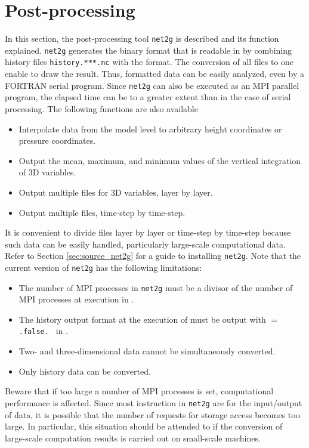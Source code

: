\section{Post-processing} \label{sec:net2g}

In this section, the post-processing tool \verb|net2g| is described and its function explained. \verb|net2g| generates the binary format that is readable in \grads by combining history files \verb|history.***.nc| with the \netcdf format.
The conversion of all files to one enable \grads to draw the result.
Thus, formatted data can be easily analyzed, even by a FORTRAN serial program.
Since \verb|net2g| can also be executed as an MPI parallel program,
the elapsed time can be to a greater extent than in the case of serial processing. The following functions are also available
\begin{itemize}
 \item Interpolate data from the model level to arbitrary height coordinates or pressure coordinates.
 \item Output the mean, maximum, and minimum values of the vertical integration of 3D variables.
 \item Output multiple files for 3D variables, layer by layer.
 \item Output multiple files, time-step by time-step.
\end{itemize}


It is convenient to divide files layer by layer or time-step by time-step because such data can be easily handled, particularly large-scale computational data. Refer to Section \ref{sec:source_net2g} for a guide to installing \verb|net2g|.
Note that the current version of \verb|net2g| has the following limitations:
\begin{itemize}
\item The number of MPI processes in \verb|net2g| must be a divisor of the number of MPI processes at execution in \scalerm.
\item The history output format at the execution of \scalerm must be output with    $=$ \verb|.false. | in .
\item Two- and three-dimensional data cannot be simultaneously converted.
\item Only history data can be converted.
\end{itemize}
Beware that if too large a number of MPI processes is set, computational performance is affected. Since most instruction in \verb|net2g| are for the input/output of data, it is possible that the number of requests for storage access becomes too large. In particular, this situation should be attended to if the conversion of large-scale computation results is carried out on small-scale machines.

